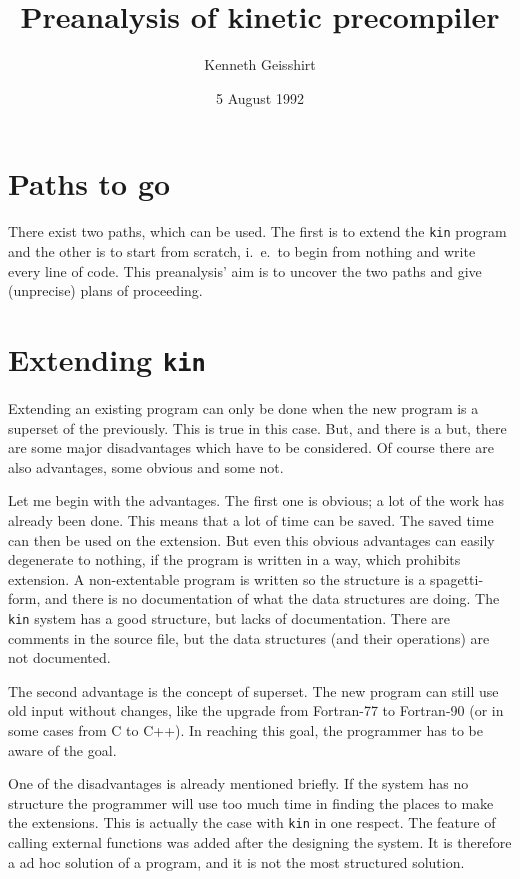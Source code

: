 \author{Kenneth Geisshirt}
\title{Preanalysis of kinetic precompiler}
\date{5 August 1992}

\maketitle
\section{Paths to go}
There exist two paths, which can be used. The first is to extend the
{\tt kin} program and the other is to start from scratch, i.\ e.\ to
begin from nothing and write every line of code. This preanalysis' aim
is to uncover the two paths and give (unprecise) plans of proceeding.

\section{Extending {\tt kin}}
Extending an existing program can only be done when the new program is
a superset of the previously. This is true in this case. But, and there 
is a but, there are some major disadvantages which have to be considered.
Of course there are also advantages, some obvious and some not.

Let me begin with the advantages. The first one is obvious; a lot of the
work has already been done. This means that a lot of time can be saved.
The saved time can then be used on the extension. But even this obvious
advantages can easily degenerate to nothing, if the program is written in
a way, which prohibits extension. A non-extentable program is written so
the structure is a spagetti-form, and there is no documentation of what
the data structures are doing. The {\tt kin} system has a good structure,
but lacks of documentation. There are comments in the source file, but
the data structures (and their operations) are not documented. 

The second advantage is the concept of superset. The new program can still
use old input without changes, like the upgrade from Fortran-77 to
Fortran-90 (or in some cases from C to C++).
In reaching this goal, the programmer has to be aware of the
goal. 

One of the disadvantages is already mentioned briefly. If the system has no
structure the programmer will use too much time in finding the places to
make the extensions. This is actually the case with {\tt kin} in one
respect. The feature of calling external functions was added after the
designing the system. It is therefore a ad hoc solution of a program, and
it is not the most structured solution.

